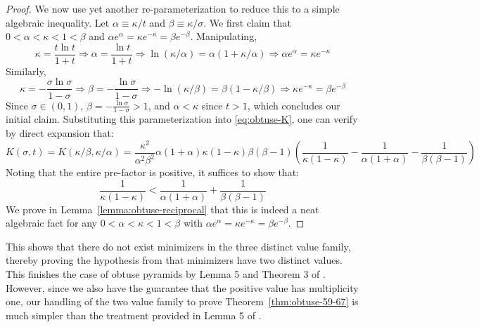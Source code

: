 \documentclass[11pt]{article}
\begin{document}
\begin{proof}
We now use yet another re-parameterization to reduce this to a simple algebraic inequality. Let $\alpha\equiv \kappa/t$ and $\beta \equiv \kappa/\sigma $. We first claim that $0<\alpha<\kappa<1<\beta$ and $\alpha e^\alpha=\kappa e^{-\kappa}=\beta e^{-\beta}$. Manipulating,
    \begin{equation}
        \kappa=\frac{t\ln t}{1+t}\Rightarrow \alpha=\frac{\ln t }{1+t}\Rightarrow \ln (\kappa/\alpha)=\alpha(1+\kappa/\alpha)\Rightarrow \alpha e^\alpha=\kappa e^{-\kappa}
    \end{equation}
    Similarly,
    \begin{equation}
        \kappa=-\frac{\sigma\ln \sigma}{1-\sigma}\Rightarrow \beta=-\frac{\ln \sigma}{1-\sigma}\Rightarrow -\ln(\kappa/\beta)=\beta(1-\kappa/\beta)\Rightarrow \kappa e^{-\kappa}=\beta e^{-\beta}
    \end{equation}
    Since $\sigma \in (0,1)$, $\beta =-\frac{\ln \sigma}{1-\sigma}>1$, and $\alpha < \kappa$ since $t>1$, which concludes our initial claim. Substituting this parameterization into \eqref{eq:obtuse-K}, one can verify by direct expansion that:
    \begin{equation}
       K(\sigma,t)=K(\kappa/\beta,\kappa/\alpha)=\frac{\kappa^2}{\alpha^2\beta^2} \alpha(1+\alpha)\kappa(1-\kappa)\beta(\beta-1)\left(\frac{1}{\kappa(1-\kappa)}-\frac{1}{\alpha(1+\alpha)}-\frac{1}{\beta(\beta-1)}\right)
    \end{equation}
    Noting that the entire pre-factor is positive, it suffices to show that:
    \begin{equation}
        \frac{1}{\kappa(1-\kappa)}<\frac{1}{\alpha(1+\alpha)}+\frac{1}{\beta(\beta-1)}
    \end{equation}
    We prove in Lemma~\ref{lemma:obtuse-reciprocal} that this is indeed a neat algebraic fact for any $0<\alpha<\kappa<1<\beta$ with $\alpha e^\alpha=\kappa e^{-\kappa}=\beta e^{-\beta}$. 
    
\end{proof}

    This shows that there do not exist minimizers in the three distinct value family, thereby proving the hypothesis from \citep{holevo2025quantum} that minimizers have two distinct values. This finishes the case of obtuse pyramids by Lemma 5 and Theorem 3 of \citep{holevo2025quantum}. However, since we also have the guarantee that the positive value has multiplicity one, our handling of the two value family to prove Theorem~\ref{thm:obtuse-59-67} is much simpler than the treatment provided in Lemma 5 of \citep{holevo2025quantum}.
\end{document}
